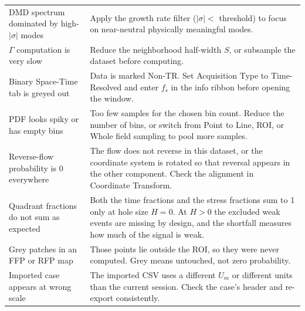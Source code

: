 \begin{table}[htbp]
\begin{tabular}{p{5.2cm}p{8.8cm}}
DMD spectrum dominated by high-$|\sigma|$ modes & Apply the growth rate filter ($|\sigma| <$ threshold) to focus on near-neutral physically meaningful modes. \\
$\Gamma$ computation is very slow & Reduce the neighborhood half-width $S$, or subsample the dataset before computing. \\
Binary Space-Time tab is greyed out & Data is marked Non-TR. Set Acquisition Type to Time-Resolved and enter $f_s$ in the info ribbon before opening the window. \\
PDF looks spiky or has empty bins & Too few samples for the chosen bin count. Reduce the number of bins, or switch from Point to Line, ROI, or Whole field sampling to pool more samples. \\
Reverse-flow probability is 0 everywhere & The flow does not reverse in this dataset, or the coordinate system is rotated so that reversal appears in the other component. Check the alignment in Coordinate Transform. \\
Quadrant fractions do not sum as expected & Both the time fractions and the stress fractions sum to 1 only at hole size $H = 0$. At $H > 0$ the excluded weak events are missing by design, and the shortfall measures how much of the signal is weak. \\
Grey patches in an FFP or RFP map & Those points lie outside the ROI, so they were never computed. Grey means untouched, not zero probability. \\
Imported case appears at wrong scale & The imported CSV uses a different $U_m$ or different units than the current session. Check the case's header and re-export consistently. \\
\bottomrule
\end{tabular}
\end{table}

